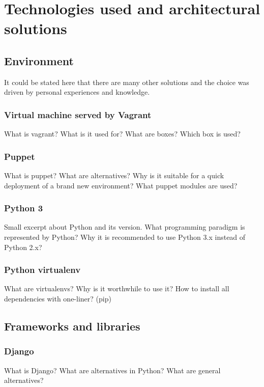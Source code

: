 \chapter{Technologies used and architectural solutions}
\ifpdf
    \graphicspath{{Chapter3/Chapter3Figs/PNG/}{Chapter3/Chapter3Figs/PDF/}{Chapter3/Chapter3Figs/}}
\else
    \graphicspath{{Chapter3/Chapter3Figs/EPS/}{Chapter3/Chapter3Figs/}}
\fi

\section{Environment}
It could be stated here that there are many other solutions and the choice was driven by personal experiences and knowledge.

\subsection{Virtual machine served by Vagrant}
What is vagrant? What is it used for? What are boxes? Which box is used?

\subsection{Puppet}
What is puppet?
What are alternatives?
Why is it suitable for a quick deployment of a brand new environment?
What puppet modules are used? 

\subsection{Python 3}
Small excerpt about Python and its version. 
What programming paradigm is represented by Python?
Why it is recommended to use Python 3.x instead of Python 2.x?

\subsection{Python virtualenv}
What are virtualenvs?
Why is it worthwhile to use it?
How to install all dependencies with one-liner? (pip)

\section{Frameworks and libraries}

\subsection{Django}
What is Django?
What are alternatives in Python? 
What are general alternatives? 

